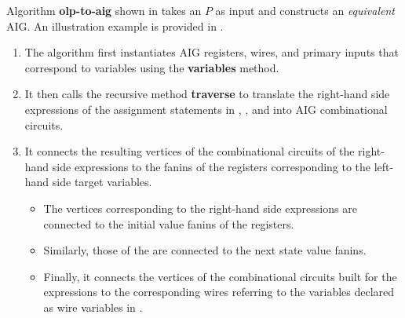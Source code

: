 Algorithm {\bf olp-to-aig} shown in   
takes an \caig $P$ as input and constructs an {\em equivalent}
AIG. An illustration example is provided in  
.

\begin{enumerate}
  \item The algorithm first instantiates AIG 
registers, wires, and primary
inputs that correspond to \caig variables 
using the {\bf variables} method. 

\item It then calls the recursive method {\bf traverse} 
  to translate the right-hand side expressions 
of the assignment statements in 
    , ,
and  into AIG combinational circuits. 

\item It connects the resulting vertices of the combinational 
circuits of the right-hand side expressions to the fanins of the registers corresponding to the left-hand side target variables. 
    \begin{itemize}

\item The vertices corresponding to the  
  right-hand side expressions are connected to the  
  initial value fanins of the registers. 
\item Similarly, those of the  are connected to 
  the next state value fanins. 
\item Finally, it connects the vertices of the combinational 
  circuits built for the  expressions to 
  the corresponding wires referring to the 
  variables declared as wire variables in .
    \end{itemize}
\end{enumerate}

